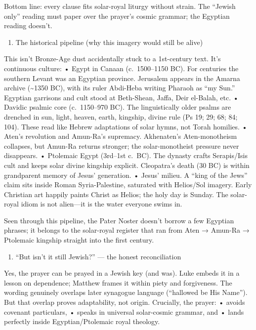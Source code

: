 Bottom line: every clause fits solar-royal liturgy without strain.
The ``Jewish only'' reading must paper over the prayer's cosmic grammar; the Egyptian reading doesn't.

\begin{enumerate}
\def\labelenumi{\arabic{enumi})}
\setcounter{enumi}{3}
\item
  The historical pipeline (why this imagery would still be alive)
\end{enumerate}

This isn't Bronze-Age dust accidentally stuck to a 1st-century text.
It's continuous culture: • Egypt in Canaan (c.~1500--1150 BC).
For centuries the southern Levant was an Egyptian province.
Jerusalem appears in the Amarna archive (\textasciitilde1350 BC), with its ruler Abdi-Heba writing Pharaoh as ``my Sun.'' Egyptian garrisons and cult stood at Beth-Shean, Jaffa, Deir el-Balah, etc.
• Davidic psalmic core (c.~1150--970 BC).
The linguistically older psalms are drenched in sun, light, heaven, earth, kingship, divine rule (Ps 19; 29; 68; 84; 104).
These read like Hebrew adaptations of solar hymns, not Torah homilies.
• Aten's revolution and Amun-Ra's supremacy.
Akhenaten's Aten-monotheism collapses, but Amun-Ra returns stronger; the solar-monotheist pressure never disappears.
• Ptolemaic Egypt (3rd--1st c.~BC).
The dynasty crafts Serapis/Isis cult and keeps solar divine kingship explicit.
Cleopatra's death (30 BC) is within grandparent memory of Jesus' generation.
• Jesus' milieu.
A ``king of the Jews'' claim sits inside Roman Syria-Palestine, saturated with Helios/Sol imagery.
Early Christian art happily paints Christ as Helios; the holy day is Sunday.
The solar-royal idiom is not alien---it is the water everyone swims in.

Seen through this pipeline, the Pater Noster doesn't borrow a few Egyptian phrases; it belongs to the solar-royal register that ran from Aten → Amun-Ra → Ptolemaic kingship straight into the first century.

\begin{enumerate}
\def\labelenumi{\arabic{enumi})}
\setcounter{enumi}{4}
\item
  ``But isn't it still Jewish?'' --- the honest reconciliation
\end{enumerate}

Yes, the prayer can be prayed in a Jewish key (and was).
Luke embeds it in a lesson on dependence; Matthew frames it within piety and forgiveness.
The wording genuinely overlaps later synagogue language (``hallowed be His Name'').
But that overlap proves adaptability, not origin.
Crucially, the prayer: • avoids covenant particulars, • speaks in universal solar-cosmic grammar, and • lands perfectly inside Egyptian/Ptolemaic royal theology.

